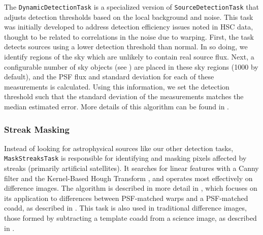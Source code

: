 The \texttt{DynamicDetectionTask} is a specialized version of \texttt{SourceDetectionTask} that adjusts detection thresholds based on the local background and noise.
This task was initially developed to address detection efficiency issues noted in HSC data, thought to be related to correlations in the noise due to warping.
First, the task detects sources using a lower detection threshold than normal.
In so doing, we identify regions of the sky which are unlikely to contain real source flux.
Next, a configurable number of sky objects (see ) are placed in these sky regions (1000 by default), and the PSF flux and standard deviation for each of these measurements is calculated.
Using this information, we set the detection threshold such that the standard deviation of the measurements matches the median estimated error.
More details of this algorithm can be found in \citet{2019PASJ...71..114A}.

\subsubsection{Streak Masking}
\label{sec:MaskStreaksTask}

Instead of looking for astrophysical sources like our other detection tasks, \texttt{MaskStreaksTask} is responsible for identifying and masking pixels affected by streaks (primarily artificial satellites).
It searches for linear features with a Canny filter and the Kernel-Based Hough Transform \citep{2008PatRe..41..299F}, and operates most effectively on difference images.
The algorithm is described in more detail in \citet{DMTN-197}, which focuses on its application to differences between PSF-matched warps and a PSF-matched coadd, as described in .
This task is also used in traditional difference images, those formed by subtracting a template coadd from a science image, as described in .
